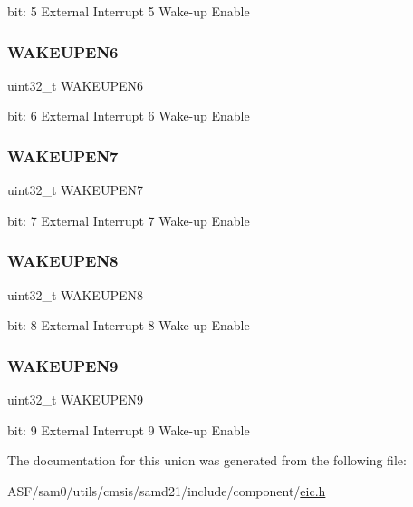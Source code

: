 bit\+: 5 External Interrupt 5 Wake-\/up Enable \mbox{\label{union_e_i_c___w_a_k_e_u_p___type_a30d601274992c8135e0d6bace25c4804}} 
\subsubsection{\texorpdfstring{WAKEUPEN6}{WAKEUPEN6}}
{\footnotesize\ttfamily uint32\+\_\+t W\+A\+K\+E\+U\+P\+E\+N6}

bit\+: 6 External Interrupt 6 Wake-\/up Enable \mbox{\label{union_e_i_c___w_a_k_e_u_p___type_a5afd682340c7d0cab259885be26c1bed}} 
\subsubsection{\texorpdfstring{WAKEUPEN7}{WAKEUPEN7}}
{\footnotesize\ttfamily uint32\+\_\+t W\+A\+K\+E\+U\+P\+E\+N7}

bit\+: 7 External Interrupt 7 Wake-\/up Enable \mbox{\label{union_e_i_c___w_a_k_e_u_p___type_aec0b88fa9f0fb7eaf34b464a7d4275af}} 
\subsubsection{\texorpdfstring{WAKEUPEN8}{WAKEUPEN8}}
{\footnotesize\ttfamily uint32\+\_\+t W\+A\+K\+E\+U\+P\+E\+N8}

bit\+: 8 External Interrupt 8 Wake-\/up Enable \mbox{\label{union_e_i_c___w_a_k_e_u_p___type_a6f2b5b327b9c0ec523cc796f54fb77c6}} 
\subsubsection{\texorpdfstring{WAKEUPEN9}{WAKEUPEN9}}
{\footnotesize\ttfamily uint32\+\_\+t W\+A\+K\+E\+U\+P\+E\+N9}

bit\+: 9 External Interrupt 9 Wake-\/up Enable 

The documentation for this union was generated from the following file\+:\begin{DoxyCompactItemize}
\item 
A\+S\+F/sam0/utils/cmsis/samd21/include/component/\mbox{\hyperlink{component_2eic_8h}{eic.\+h}}\end{DoxyCompactItemize}
